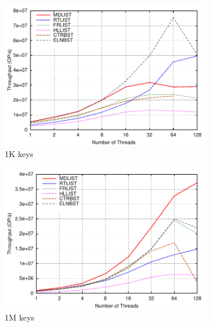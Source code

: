 \documentclass[10pt,conference,compsocconf]{IEEEtran}
\begin{document}
\begin{figure}[t]
    \begin{subfigure}{0.32\textwidth}
        \centering
        \includegraphics[width=1\columnwidth]{./data/amd20ins1Kkey}
        \caption{1K keys}
        \label{fig:1k20ins}
    \end{subfigure}
    \hfill
    \begin{subfigure}{0.32\textwidth}
        \centering
        \includegraphics[width=1\columnwidth]{./data/amd20ins1Mkey}
        \caption{1M keys}
        \label{fig:1m20ins}
    \end{subfigure}
    \hfill
    \begin{subfigure}{0.32\textwidth}
        \centering

\end{subfigure}
\end{figure}
\end{document}
